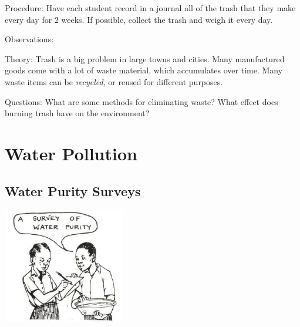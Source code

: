 \begin{multicols}{2}
\begin{description*}
\item[Procedure:]{Have each student record in a journal all of the trash that they make every day for 2 weeks. If possible, collect the trash and weigh it every day.}
\item[Observations:]{}
\item[Theory:]{Trash is a big problem in large towns and cities. Many manufactured goods come with a lot of waste material, which accumulates over time. Many waste items can be \emph{recycled}, or reused for different purposes.}
\item[Questions:]{What are some methods for eliminating waste? What effect does burning trash have on the environment?}
\end{description*}


\section*{Water Pollution}


\subsection{Water Purity Surveys}

\begin{center}
\includegraphics[width=0.4\textwidth]{./img/source/water-purity.jpg}
\end{center}


\end{multicols}
